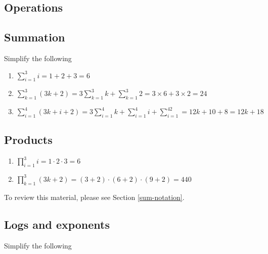 \documentclass[]{book}
\newenvironment{Shaded}{\begin{snugshade}}{\end{snugshade}}
\theoremstyle{definition}
\theoremstyle{definition}
\theoremstyle{definition}
\theoremstyle{remark}
\begin{document}
\begin{Shaded}
\begin{Highlighting}[]
\begin{Shaded}
\begin{Highlighting}[]
\begin{Shaded}
\begin{Highlighting}[]
\hypertarget{operations-1}{%
\section*{Operations}\label{operations-1}}

\hypertarget{summation-1}{%
\subsection*{Summation}\label{summation-1}}

Simplify the following

\begin{enumerate}
\def\labelenumi{\arabic{enumi}.}
\item
  \(\sum\limits_{i = 1}^3 i = 1 + 2+ 3 = 6\)
\item
  \(\sum\limits_{k = 1}^3(3k + 2) = 3\sum\limits_{k=1}^3k + \sum\limits_{k=1}^3 2= 3\times 6 + 3\times 2 = 24\)
\item
  \(\sum\limits_{i= 1}^4 (3k + i + 2) = 3\sum\limits_{i= 1}^4k + \sum\limits_{i= 1}^4i + \sum\limits_{i= 1}^42 = 12k + 10 + 8 = 12k + 18\)
\end{enumerate}

\hypertarget{products-1}{%
\subsection*{Products}\label{products-1}}

\begin{enumerate}
\def\labelenumi{\arabic{enumi}.}
\item
  \(\prod\limits_{i= 1}^3 i = 1\cdot 2\cdot 3 = 6\)
\item
  \(\prod\limits_{k=1}^3(3k + 2) = (3 + 2)\cdot (6 + 2)\cdot (9 + 2) = 440\)
\end{enumerate}

To review this material, please see Section \ref{sum-notation}.

\hypertarget{logs-and-exponents-1}{%
\subsection*{Logs and exponents}\label{logs-and-exponents-1}}

Simplify the following


\end{Highlighting}
\end{Shaded}
\end{Highlighting}
\end{Shaded}
\end{Highlighting}
\end{Shaded}
\end{document}
